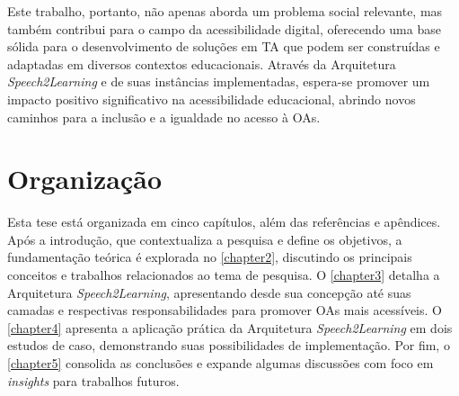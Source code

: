 Este trabalho, portanto, não apenas aborda um problema social relevante, mas também contribui para o campo da acessibilidade digital, oferecendo uma base sólida para o desenvolvimento de soluções em TA que podem ser construídas e adaptadas em diversos contextos educacionais. Através da Arquitetura \textit{Speech2Learning} e de suas instâncias implementadas, espera-se promover um impacto positivo significativo na acessibilidade educacional, abrindo novos caminhos para a inclusão e a igualdade no acesso à OAs.

\section{Organização}

Esta tese está organizada em cinco capítulos, além das referências e apêndices. Após a introdução, que contextualiza a pesquisa e define os objetivos, a fundamentação teórica é explorada no \autoref{chapter2}, discutindo os principais conceitos e trabalhos relacionados ao tema de pesquisa. O \autoref{chapter3} detalha a Arquitetura \textit{Speech2Learning}, apresentando desde sua concepção até suas camadas e respectivas responsabilidades para promover OAs mais acessíveis. O \autoref{chapter4} apresenta a aplicação prática da Arquitetura \textit{Speech2Learning} em dois estudos de caso, demonstrando suas possibilidades de implementação. Por fim, o \autoref{chapter5} consolida as conclusões e expande algumas discussões com foco em \textit{insights} para trabalhos futuros.